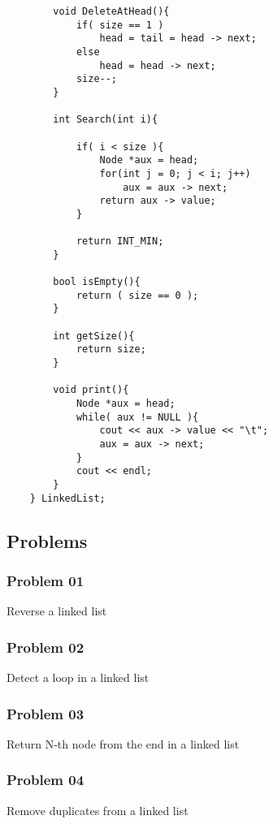\begin{lstlisting}
        void DeleteAtHead(){
            if( size == 1 )
                head = tail = head -> next; 
            else
                head = head -> next;
            size--;
        }

        int Search(int i){

            if( i < size ){
                Node *aux = head;
                for(int j = 0; j < i; j++)
                    aux = aux -> next;
                return aux -> value;
            }

            return INT_MIN;
        }

        bool isEmpty(){
            return ( size == 0 );
        }

        int getSize(){
            return size;
        }

        void print(){
            Node *aux = head;
            while( aux != NULL ){
                cout << aux -> value << "\t";
                aux = aux -> next;
            }
            cout << endl;
        }
    } LinkedList;
\end{lstlisting}

\subsection{Problems}
\subsubsection{Problem 01}
\textsf{Reverse a linked list}


\subsubsection{Problem 02}
\textsf{Detect a loop in a linked list}


\subsubsection{Problem 03}
\textsf{Return N-th node from the end in a linked list}


\subsubsection{Problem 04}
\textsf{Remove duplicates from a linked list}

